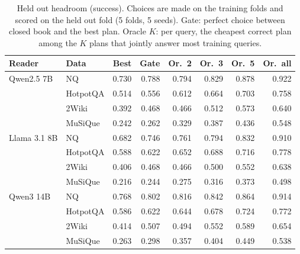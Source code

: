 \begin{table}[t]
\centering
\caption{Held out headroom (success). Choices are made on the training folds and scored on the held out fold (5 folds, 5 seeds). Gate: perfect choice between closed book and the best plan. Oracle $K$: per query, the cheapest correct plan among the $K$ plans that jointly answer most training queries.}
\label{tab:oracles}
\scriptsize
\setlength{\tabcolsep}{3pt}
\begin{tabular}{llrrrrrr}
\toprule
Reader & Data & Best & Gate & Or.~2 & Or.~3 & Or.~5 & Or.~all \\
\midrule
Qwen2.5 7B & NQ & 0.730 & 0.788 & 0.794 & 0.829 & 0.878 & 0.922 \\
 & HotpotQA & 0.514 & 0.556 & 0.612 & 0.664 & 0.703 & 0.758 \\
 & 2Wiki & 0.392 & 0.468 & 0.466 & 0.512 & 0.573 & 0.640 \\
 & MuSiQue & 0.242 & 0.262 & 0.329 & 0.387 & 0.436 & 0.548 \\
\midrule
Llama 3.1 8B & NQ & 0.682 & 0.746 & 0.761 & 0.794 & 0.832 & 0.910 \\
 & HotpotQA & 0.588 & 0.622 & 0.652 & 0.688 & 0.716 & 0.778 \\
 & 2Wiki & 0.406 & 0.468 & 0.466 & 0.500 & 0.552 & 0.638 \\
 & MuSiQue & 0.216 & 0.244 & 0.275 & 0.316 & 0.373 & 0.498 \\
\midrule
Qwen3 14B & NQ & 0.768 & 0.802 & 0.816 & 0.842 & 0.864 & 0.914 \\
 & HotpotQA & 0.586 & 0.622 & 0.644 & 0.678 & 0.724 & 0.772 \\
 & 2Wiki & 0.414 & 0.507 & 0.494 & 0.552 & 0.589 & 0.654 \\
 & MuSiQue & 0.263 & 0.298 & 0.357 & 0.404 & 0.449 & 0.538 \\
\bottomrule
\end{tabular}
\end{table}